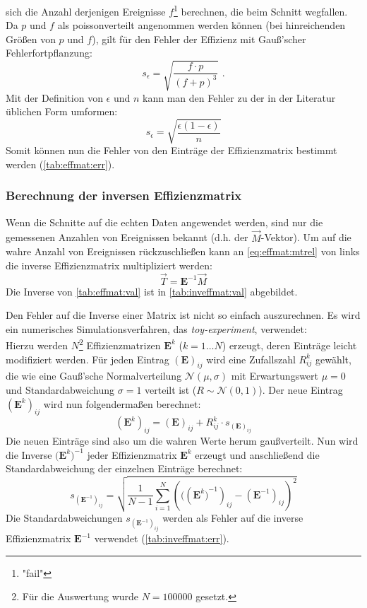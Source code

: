 sich die Anzahl derjenigen Ereignisse $f$\footnote{"fail"} berechnen, die beim Schnitt wegfallen. Da $p$ und $f$ als poissonverteilt angenommen 
werden können (bei hinreichenden Größen von $p$ und $f$), gilt für den Fehler der Effizienz mit Gauß'scher Fehlerfortpflanzung:
\begin{equation}
    s_\epsilon = \sqrt{\frac{f \cdot p}{ \left( f + p \right)^3}} \ \, .
\end{equation}
Mit der Definition von $\epsilon$ und $n$ kann man den Fehler zu der in der Literatur üblichen Form umformen:
\begin{equation}
    s_\epsilon = \sqrt{\frac{\epsilon (1-\epsilon)}{n}}
\end{equation}
Somit können nun die Fehler von den Einträge der Effizienzmatrix bestimmt werden (\autoref{tab:effmat:err}).

\subsubsection{Berechnung der inversen Effizienzmatrix}
Wenn die Schnitte auf die echten Daten angewendet werden, sind nur die gemessenen Anzahlen von Ereignissen bekannt 
(d.h. der $\vec{M}$-Vektor). Um auf die wahre Anzahl von Ereignissen rückzuschließen kann an \autoref{eq:effmat:mtrel} 
von links die inverse Effizienzmatrix multipliziert werden:
\begin{equation}
    \vec{T} = \bm{E}^{-1} \vec{M}
\end{equation}
Die Inverse von \autoref{tab:effmat:val} ist in \autoref{tab:inveffmat:val} abgebildet.

Den Fehler auf die Inverse einer Matrix ist nicht so einfach auszurechnen. Es wird ein numerisches Simulationsverfahren, 
das \emph{toy-experiment}, verwendet: \\
Hierzu werden $N$\footnote{Für die Auswertung wurde $N=100000$ gesetzt.} Effizienzmatrizen $\bm{E}^k$ ($k=1 \ldots N$) erzeugt, 
deren Einträge leicht modifiziert werden. Für jeden Eintrag $(\bm{E})_{ij}$ wird eine Zufallszahl $R_{ij}^k$ 
gewählt, die wie eine Gauß'sche Normalverteilung $\mathcal{N}(\mu, \sigma)$ mit Erwartungswert $\mu = 0$ und 
Standardabweichung $\sigma = 1$ verteilt ist ($R \sim \mathcal{N}(0, 1)$). Der neue Eintrag $(\bm{E}^k)_{ij}$ wird nun folgendermaßen berechnet:
\begin{equation}
    (\bm{E}^k)_{ij} = (\bm{E})_{ij} + R_{ij}^k \cdot s_{(\bm{E})_{ij}}
\end{equation}
Die neuen Einträge sind also um die wahren Werte herum gaußverteilt. Nun wird die Inverse ${(\bm{E}^k})^{-1}$ jeder 
Effizienzmatrix $\bm{E}^k$ erzeugt und 
anschließend die Standardabweichung der einzelnen Einträge berechnet:
\begin{equation}
    s_{(\bm{E}^{-1})_{ij}} = \sqrt{\frac{1}{N-1} \sum_{i=1}^{N} \left((({\bm{E}^k)}^{-1})_{ij} - (\bm{E}^{-1})_{ij} \right)^2 }
\end{equation}
Die Standardabweichungen $s_{(\bm{E}^{-1})_{ij}}$ werden als Fehler auf die inverse Effizienzmatrix $\bm{E}^{-1}$ verwendet 
(\autoref{tab:inveffmat:err}).

